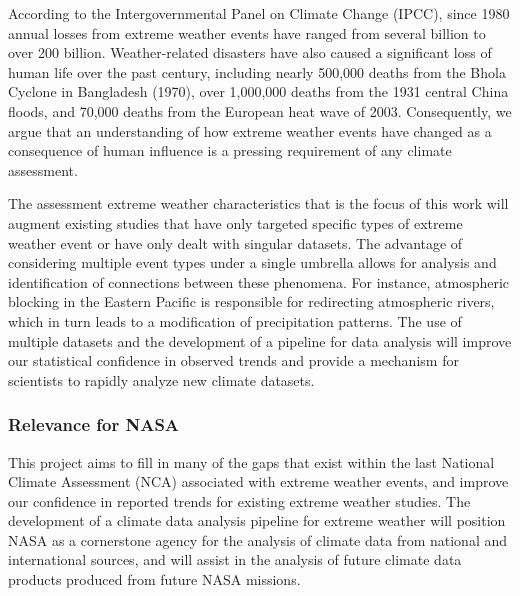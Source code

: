 \documentclass[11pt]{article}
\begin{document}
According to the Intergovernmental Panel on Climate Change (IPCC), since 1980 annual losses from extreme weather events have ranged from several billion to over 200 billion.  Weather-related disasters have also caused a significant loss of human life over the past century, including nearly 500,000 deaths from the Bhola Cyclone in Bangladesh (1970), over 1,000,000 deaths from the 1931 central China floods, and 70,000 deaths from the European heat wave of 2003.  Consequently, we argue that an understanding of how extreme weather events have changed as a consequence of human influence is a pressing requirement of any climate assessment.

The assessment extreme weather characteristics that is the focus of this work will augment existing studies that have only targeted specific types of extreme weather event or have only dealt with singular datasets.  The advantage of considering multiple event types under a single umbrella allows for analysis and identification of connections between these phenomena.  For instance, atmospheric blocking in the Eastern Pacific is responsible for redirecting atmospheric rivers, which in turn leads to a modification of precipitation patterns.  The use of multiple datasets and the development of a pipeline for data analysis will improve our statistical confidence in observed trends and provide a mechanism for scientists to rapidly analyze new climate datasets.

\subsubsection{Relevance for NASA}

This project aims to fill in many of the gaps that exist within the last National Climate Assessment (NCA) associated with extreme weather events, and improve our confidence in reported trends for existing extreme weather studies.  The development of a climate data analysis pipeline for extreme weather will position NASA as a cornerstone agency for the analysis of climate data from national and international sources, and will assist in the analysis of future climate data products produced from future NASA missions.

\end{document}
